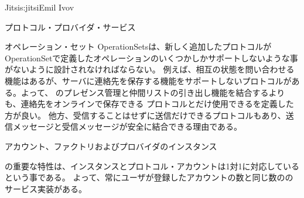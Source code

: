 \begin{aosachapter}{Jitsi}{s:jitsi}{Emil Ivov}
\begin{aosasect1}{プロトコル・プロバイダ・サービス}
\begin{aosasect2}{オペレーション・セット}
OperationSetsは、新しく追加したプロトコルがOperationSetで定義したオペレーションのいくつかしかサポートしないような事がないように設計されなければならない。
例えば、相互の状態を問い合わせる機能はあるが、サーバに連絡先を保存する機能をサポートしないプロトコルがある。よって、
のプレゼンス管理と仲間リストの引き出し機能を結合するよりも、連絡先をオンラインで保存できる
プロトコルとだけ使用できるを定義した方が良い。
他方、受信することはせずに送信だけできるプロトコルもあり、送信メッセージと受信メッセージが安全に結合できる理由である。


\end{aosasect2}

\begin{aosasect2}{アカウント、ファクトリおよびプロバイダのインスタンス}

の重要な特性は、インスタンスとプロトコル・アカウントは1対1に対応しているという事である。
よって、常にユーザが登録したアカウントの数と同じ数ののサービス実装がある。


\end{aosasect2}
\end{aosasect1}
\end{aosachapter}
